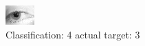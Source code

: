 \begin{figure}[h!]
\begin{center}
\includegraphics[width=0.60\columnwidth]{figures/ID1402_class_4_target_3.png}
\end{center}
\caption{ Classification: 4 actual target: 3}
\label{fig:ID1402_class_4_target_3}
\end{figure}
